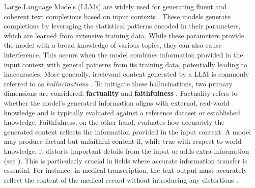 

Large Language Models (LLMs) are widely used for generating fluent and coherent text completions based on input contexts \citep{brown2020language}. These models generate completions by leveraging the statistical patterns encoded in their parameters, which are learned from extensive training data. While these parameters provide the model with a broad knowledge of various topics, they can also cause interference. This occurs when the model combines information provided in the input context with general patterns from its training data, potentially leading to inaccuracies. More generally, irrelevant content generated by a LLM is commonly referred to as \textit{hallucinations} \citep{RebuffelRSSCG22,faithfulness-summarization}.
To mitigate these hallucinations, two primary dimensions are considered: \textbf{factuality} and \textbf{faithfulness} \citep{surveyhallucinationllm}. Factuality refers to whether the model's generated information aligns with external, real-world knowledge and is typically evaluated against a reference dataset or established knowledge. Faithfulness, on the other hand, evaluates how accurately the generated content reflects the information provided in the input context. A model may produce factual but unfaithful content if, while true with respect to world knowledge, it distorts important details from the input or adds extra information (see ). This is particularly crucial in fields where accurate information transfer is essential. For instance, in medical transcription, the text output must accurately reflect the content of the medical record without introducing any distortions \citep{cawsey1997naturallanguagegenerationhealthcare}. 




